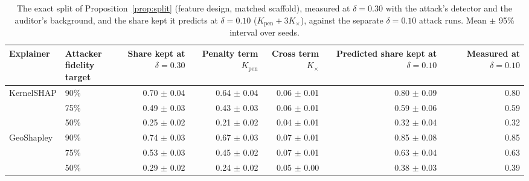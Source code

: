 \begin{table}[t]
\centering
\footnotesize
\setlength{\tabcolsep}{3.5pt}
\begin{adjustbox}{max width=\linewidth}
\begin{tabular}{llrrrrr}
\toprule
Explainer & \makecell[b]{Attacker \\ fidelity \\ target} & \makecell[b]{Share kept at \\ $\delta{=}0.30$} & \makecell[b]{Penalty term \\ $K_{\text{pen}}$} & \makecell[b]{Cross term \\ $K_{\times}$} & \makecell[b]{Predicted \\ share kept at \\ $\delta{=}0.10$} & \makecell[b]{Measured at \\ $\delta{=}0.10$} \\
\midrule
KernelSHAP & 90\% & 0.70 $\pm$ 0.04 & 0.64 $\pm$ 0.04 & 0.06 $\pm$ 0.01 & 0.80 $\pm$ 0.09 & 0.80 \\
 & 75\% & 0.49 $\pm$ 0.03 & 0.43 $\pm$ 0.03 & 0.06 $\pm$ 0.01 & 0.59 $\pm$ 0.06 & 0.59 \\
 & 50\% & 0.25 $\pm$ 0.02 & 0.21 $\pm$ 0.02 & 0.04 $\pm$ 0.01 & 0.32 $\pm$ 0.04 & 0.32 \\
\midrule
GeoShapley & 90\% & 0.74 $\pm$ 0.03 & 0.67 $\pm$ 0.03 & 0.07 $\pm$ 0.01 & 0.85 $\pm$ 0.08 & 0.85 \\
 & 75\% & 0.53 $\pm$ 0.03 & 0.45 $\pm$ 0.02 & 0.07 $\pm$ 0.01 & 0.63 $\pm$ 0.04 & 0.63 \\
 & 50\% & 0.29 $\pm$ 0.02 & 0.24 $\pm$ 0.02 & 0.05 $\pm$ 0.00 & 0.38 $\pm$ 0.03 & 0.39 \\
\bottomrule
\end{tabular}
\end{adjustbox}
\caption{The exact split of Proposition~\ref{prop:split} (feature design, matched scaffold), measured at $\delta = 0.30$ with the attack's detector and the auditor's background, and the share kept it predicts at $\delta = 0.10$ ($K_{\text{pen}} + 3K_{\times}$), against the separate $\delta = 0.10$ attack runs. Mean $\pm$ 95\% interval over seeds.}
\label{tab:split}
\end{table}
